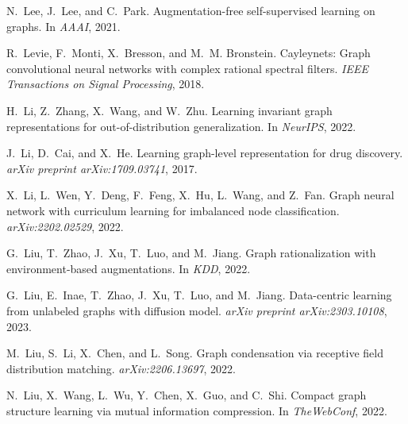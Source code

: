 \documentclass[11pt]{article}
\begin{document}
\begin{thebibliography}{10}
\begin{small}
N.~Lee, J.~Lee, and C.~Park.
\newblock Augmentation-free self-supervised learning on graphs.
\newblock In \emph{AAAI}, 2021.

R.~Levie, F.~Monti, X.~Bresson, and M.~M. Bronstein.
\newblock Cayleynets: Graph convolutional neural networks with complex rational
  spectral filters.
\newblock \emph{IEEE Transactions on Signal Processing}, 2018.

H.~Li, Z.~Zhang, X.~Wang, and W.~Zhu.
\newblock Learning invariant graph representations for out-of-distribution
  generalization.
\newblock In \emph{NeurIPS}, 2022{}.

J.~Li, D.~Cai, and X.~He.
\newblock Learning graph-level representation for drug discovery.
\newblock \emph{arXiv preprint arXiv:1709.03741}, 2017.

X.~Li, L.~Wen, Y.~Deng, F.~Feng, X.~Hu, L.~Wang, and Z.~Fan.
\newblock Graph neural network with curriculum learning for imbalanced node
  classification.
\newblock \emph{arXiv:2202.02529}, 2022{}.

G.~Liu, T.~Zhao, J.~Xu, T.~Luo, and M.~Jiang.
\newblock Graph rationalization with environment-based augmentations.
\newblock In \emph{KDD}, 2022{}.

G.~Liu, E.~Inae, T.~Zhao, J.~Xu, T.~Luo, and M.~Jiang.
\newblock Data-centric learning from unlabeled graphs with diffusion model.
\newblock \emph{arXiv preprint arXiv:2303.10108}, 2023.

M.~Liu, S.~Li, X.~Chen, and L.~Song.
\newblock Graph condensation via receptive field distribution matching.
\newblock \emph{arXiv:2206.13697}, 2022{}.

N.~Liu, X.~Wang, L.~Wu, Y.~Chen, X.~Guo, and C.~Shi.
\newblock Compact graph structure learning via mutual information compression.
\newblock In \emph{TheWebConf}, 2022{}.


\end{small}
\end{thebibliography}
\end{document}
